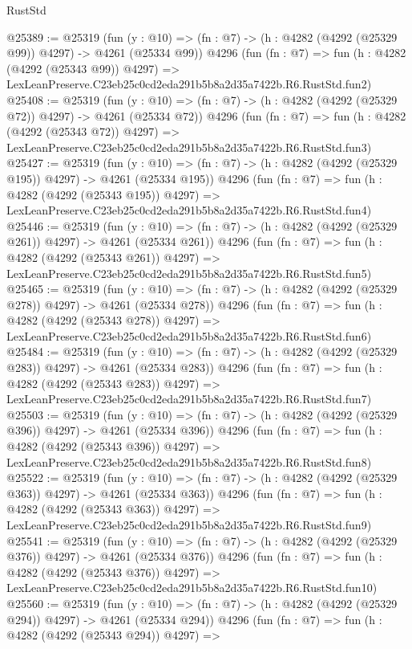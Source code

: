 \begin{lexlean}{RustStd}
\begin{coremodule}
@25389 := @25319
    (fun (y : @10) => (fn : @7) -> (h : @4282 (@4292 (@25329 @99)) @4297) -> @4261 (@25334 @99))
    @4296
    (fun (fn : @7) =>
    fun (h : @4282 (@4292 (@25343 @99)) @4297) =>
    LexLeanPreserve.C23eb25c0cd2eda291b5b8a2d35a7422b.R6.RustStd.fun2)
@25408 := @25319
    (fun (y : @10) => (fn : @7) -> (h : @4282 (@4292 (@25329 @72)) @4297) -> @4261 (@25334 @72))
    @4296
    (fun (fn : @7) =>
    fun (h : @4282 (@4292 (@25343 @72)) @4297) =>
    LexLeanPreserve.C23eb25c0cd2eda291b5b8a2d35a7422b.R6.RustStd.fun3)
@25427 := @25319
    (fun (y : @10) => (fn : @7) -> (h : @4282 (@4292 (@25329 @195)) @4297) -> @4261 (@25334 @195))
    @4296
    (fun (fn : @7) =>
    fun (h : @4282 (@4292 (@25343 @195)) @4297) =>
    LexLeanPreserve.C23eb25c0cd2eda291b5b8a2d35a7422b.R6.RustStd.fun4)
@25446 := @25319
    (fun (y : @10) => (fn : @7) -> (h : @4282 (@4292 (@25329 @261)) @4297) -> @4261 (@25334 @261))
    @4296
    (fun (fn : @7) =>
    fun (h : @4282 (@4292 (@25343 @261)) @4297) =>
    LexLeanPreserve.C23eb25c0cd2eda291b5b8a2d35a7422b.R6.RustStd.fun5)
@25465 := @25319
    (fun (y : @10) => (fn : @7) -> (h : @4282 (@4292 (@25329 @278)) @4297) -> @4261 (@25334 @278))
    @4296
    (fun (fn : @7) =>
    fun (h : @4282 (@4292 (@25343 @278)) @4297) =>
    LexLeanPreserve.C23eb25c0cd2eda291b5b8a2d35a7422b.R6.RustStd.fun6)
@25484 := @25319
    (fun (y : @10) => (fn : @7) -> (h : @4282 (@4292 (@25329 @283)) @4297) -> @4261 (@25334 @283))
    @4296
    (fun (fn : @7) =>
    fun (h : @4282 (@4292 (@25343 @283)) @4297) =>
    LexLeanPreserve.C23eb25c0cd2eda291b5b8a2d35a7422b.R6.RustStd.fun7)
@25503 := @25319
    (fun (y : @10) => (fn : @7) -> (h : @4282 (@4292 (@25329 @396)) @4297) -> @4261 (@25334 @396))
    @4296
    (fun (fn : @7) =>
    fun (h : @4282 (@4292 (@25343 @396)) @4297) =>
    LexLeanPreserve.C23eb25c0cd2eda291b5b8a2d35a7422b.R6.RustStd.fun8)
@25522 := @25319
    (fun (y : @10) => (fn : @7) -> (h : @4282 (@4292 (@25329 @363)) @4297) -> @4261 (@25334 @363))
    @4296
    (fun (fn : @7) =>
    fun (h : @4282 (@4292 (@25343 @363)) @4297) =>
    LexLeanPreserve.C23eb25c0cd2eda291b5b8a2d35a7422b.R6.RustStd.fun9)
@25541 := @25319
    (fun (y : @10) => (fn : @7) -> (h : @4282 (@4292 (@25329 @376)) @4297) -> @4261 (@25334 @376))
    @4296
    (fun (fn : @7) =>
    fun (h : @4282 (@4292 (@25343 @376)) @4297) =>
    LexLeanPreserve.C23eb25c0cd2eda291b5b8a2d35a7422b.R6.RustStd.fun10)
@25560 := @25319
    (fun (y : @10) => (fn : @7) -> (h : @4282 (@4292 (@25329 @294)) @4297) -> @4261 (@25334 @294))
    @4296
    (fun (fn : @7) =>
    fun (h : @4282 (@4292 (@25343 @294)) @4297) =>

\end{coremodule}
\end{lexlean}
